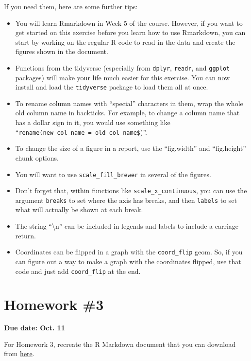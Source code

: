 \documentclass[]{book}
\providecommand{\tightlist}{%
  \setlength{\itemsep}{0pt}\setlength{\parskip}{0pt}}
\theoremstyle{definition}
\theoremstyle{definition}
\theoremstyle{definition}
\theoremstyle{remark}
\begin{document}
If you need them, here are some further tips:

\begin{itemize}
\tightlist
\item
  You will learn Rmarkdown in Week 5 of the course. However, if you want
  to get started on this exercise before you learn how to use Rmarkdown,
  you can start by working on the regular R code to read in the data and
  create the figures shown in the document.
\item
  Functions from the tidyverse (especially from \texttt{dplyr},
  \texttt{readr}, and \texttt{ggplot} packages) will make your life much
  easier for this exercise. You can now install and load the
  \texttt{tidyverse} package to load them all at once.
\item
  To rename column names with ``special'' characters in them, wrap the
  whole old column name in backticks. For example, to change a column
  name that has a dollar sign in it, you would use something like
  ``\texttt{rename(new\_col\_name\ =\ \textasciigrave{}old\_col\_name\$\textasciigrave{}})''.
\item
  To change the size of a figure in a report, use the ``fig.width'' and
  ``fig.height'' chunk options.
\item
  You will want to use \texttt{scale\_fill\_brewer} in several of the
  figures.
\item
  Don't forget that, within functions like
  \texttt{scale\_x\_continuous}, you can use the argument
  \texttt{breaks} to set where the axis has breaks, and then
  \texttt{labels} to set what will actually be shown at each break.
\item
  The string ``\textbackslash{}n'' can be included in legends and labels
  to include a carriage return.
\item
  Coordinates can be flipped in a graph with the \texttt{coord\_flip}
  geom. So, if you can figure out a way to make a graph with the
  coordinates flipped, use that code and just add \texttt{coord\_flip}
  at the end.
\end{itemize}

\section{Homework \#3}\label{homework-3}

\textbf{Due date: Oct. 11}

For Homework 3, recreate the R Markdown document that you can download
from
\href{https://github.com/geanders/RProgrammingForResearch/raw/master/Homework/Homework_3.docx}{here}.
\end{document}
